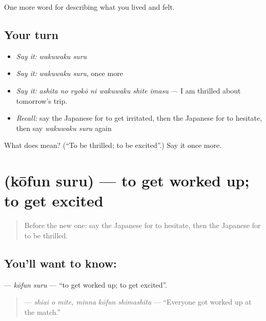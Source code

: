 \begin{grammarlens}[title={What you've built}]
One more word for describing what you lived and felt.
\end{grammarlens}

\subsection*{Your turn}
\begin{itemize}
\raggedright
  \item \emph{Say it:} \emph{wakuwaku suru}
  \item \emph{Say it:} \emph{wakuwaku suru}, once more
  \item \emph{Say it:} \emph{ashita no ryokō ni wakuwaku shite imasu} — I am thrilled about tomorrow's trip.
  \item \emph{Recall:} say the Japanese for to get irritated, then the Japanese for to hesitate, then say \emph{wakuwaku suru} again
\end{itemize}

\begin{tcolorbox}[breakable,colback=teal!4,colframe=teal!35!black,title={Before you move on}]
What does  mean? (\textquotedblleft{}To be thrilled; to be excited\textquotedblright{}.) Say it once more.
\end{tcolorbox}
\section[\texorpdfstring{\ja{こうふんする} (kōfun suru)}{こうふんする (kōfun suru)}]{ (kōfun suru) — to get worked up; to get excited}

\label{lesson:JA-C428-koufun-suru}



\begin{quote}
Before the new one: say the Japanese for to hesitate, then the Japanese for to be thrilled.
\end{quote}

\subsection*{You'll want to know: }
\textbf{} — \emph{kōfun suru} — \textquotedblleft{}to get worked up; to get excited\textquotedblright{}.

\begin{quote}
\textbf{  } — \emph{shiai o mite, minna kōfun shimashita} — \textquotedblleft{}Everyone got worked up at the match.\textquotedblright{}
\end{quote}

